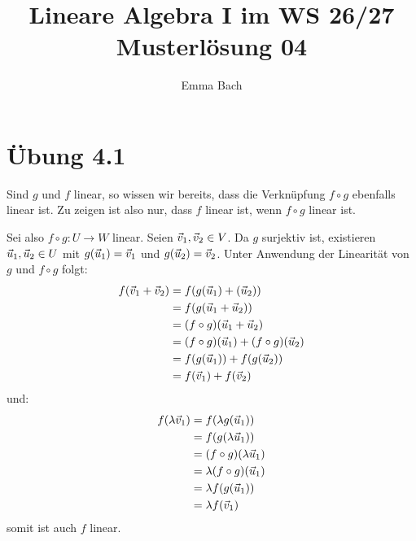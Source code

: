 \documentclass{article}
\begin{document}
\title{\Huge\vspace{-1.5cm}\textbf{Lineare Algebra I im WS 26/27\\Musterlösung 04}}
\author{Emma Bach}

\maketitle

\section*{Übung 4.1}
\separator


Sind $g$ und $f$ linear, so wissen wir bereits, dass die Verknüpfung $f \circ g$ ebenfalls linear ist. Zu zeigen ist also nur, dass $f$ linear ist, wenn $f \circ g$ linear ist. 

\newpar

Sei also $f \circ g : U \to W$ linear. Seien $\vec{v}_1, \vec{v}_2 \in V$. 
Da $g$ surjektiv ist, existieren $\vec{u}_1, \vec{u}_2 \in U$ mit $g(\vec{u}_1) = \vec{v}_1$ und $g(\vec{u}_2) = \vec{v}_2$. Unter Anwendung der Linearität von $g$ und $f \circ g$ folgt:
\begin{align*}
	f(\vec{v}_1 + \vec{v}_2) 
	&= f(g(\vec{u}_1) + (\vec{u}_2))\\
	&= f(g(\vec{u}_1 + \vec{u}_2))\\
	&= (f \circ g)(\vec{u}_1 + \vec{u}_2)\\
	&= (f \circ g)(\vec{u}_1) + (f \circ g)(\vec{u}_2)\\
	&= f(g(\vec{u}_1)) + f(g(\vec{u}_2))\\
	&= f(\vec{v}_1) + f(\vec{v}_2)
\end{align*}
und:
\begin{align*}
	f(\lambda \vec{v}_1)
	&=
	f(\lambda g(\vec{u}_1))\\
	&=
	f(g(\lambda\vec{u}_1))\\
	&=
	(f \circ g)(\lambda \vec{u}_1)\\
	&=
	\lambda (f \circ g)(\vec{u}_1)\\
	&=
	\lambda f(g(\vec{u}_1))\\
	&=
	\lambda f(\vec{v}_1)
\end{align*}
somit ist auch $f$ linear.

\clearpage
\end{document}
